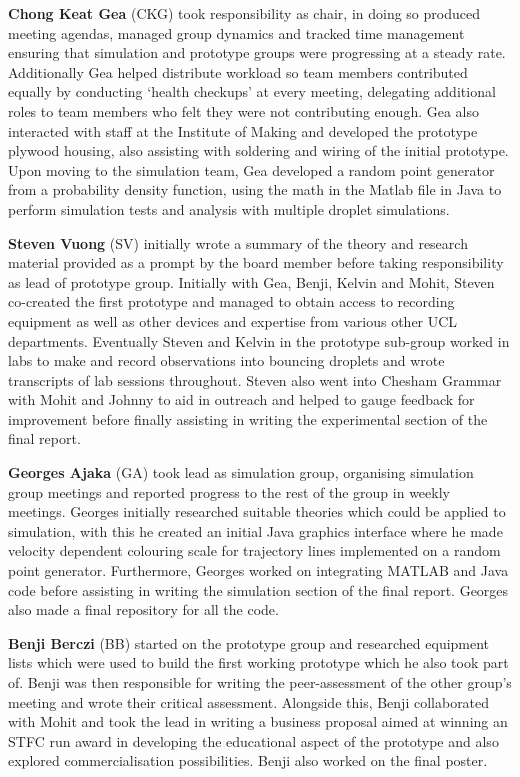 \textbf{Chong Keat Gea} (CKG) took responsibility as chair, in doing so produced meeting agendas, managed group dynamics and tracked time management ensuring that simulation and prototype groups were progressing at a steady rate. Additionally Gea helped distribute workload so team members contributed equally by conducting ‘health checkups’ at every meeting, delegating additional roles to team members who felt they were not contributing enough. Gea also interacted with staff at the Institute of Making and developed the prototype plywood housing, also assisting with soldering and wiring of the initial prototype. Upon moving to the simulation team, Gea developed a random point generator from a probability density function, using the math in the Matlab file in Java to perform simulation tests and analysis with multiple droplet simulations.

\textbf{Steven Vuong} (SV) initially wrote a summary of the theory and research material provided as a prompt by the board member before taking responsibility as lead of prototype group. Initially with Gea, Benji, Kelvin and Mohit, Steven co-created the first prototype and managed to obtain access to recording equipment as well as other devices and expertise from various other UCL departments. Eventually Steven and Kelvin in the prototype sub-group worked in labs to make and record observations into bouncing droplets and wrote transcripts of lab sessions throughout. Steven also went into Chesham Grammar with Mohit and Johnny to aid in outreach and helped to gauge feedback for improvement before finally assisting in writing the experimental section of the final report.

\textbf{Georges Ajaka} (GA) took lead as simulation group, organising simulation group meetings and reported progress to the rest of the group in weekly meetings. Georges initially researched suitable theories which could be applied to simulation, with this he created an initial Java graphics interface where he made velocity dependent colouring scale for trajectory lines implemented on a random point generator. Furthermore, Georges worked on integrating MATLAB and Java code before assisting in writing the simulation section of the final report. Georges also made a final repository for all the code.

\textbf{Benji Berczi} (BB) started on the prototype group and researched equipment lists which were used to build the first working prototype which he also took part of. Benji was then responsible for writing the peer-assessment of the other group’s meeting and wrote their critical assessment. Alongside this, Benji collaborated with Mohit and took the lead in writing a business proposal aimed at winning an STFC run award in developing the educational aspect of the prototype and also explored commercialisation possibilities. Benji also worked on the final poster.

